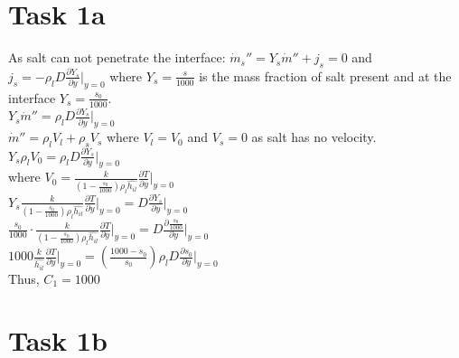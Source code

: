\documentclass[letterpaper, 10pt]{article}
\begin{document}
	
	\section*{Task 1a} %
	\label{sec:Task 1a}
	As salt can not penetrate the interface: $\dot{m}_s'' = Y_s \dot{m}'' + j_s = 0$ and $j_s = -\rho_l D \frac{\partial Y_s}{\partial y}\big|_{y=0}$ where $Y_s = \frac{s}{1000}$ is the mass fraction of salt present and at the interface $Y_s = \frac{s_0}{1000}$.\\
		
	\noindent $Y_s \dot{m}'' = \rho_l D \frac{\partial Y_s}{\partial y}\big|_{y=0}$\\
	\noindent $\dot{m}'' = \rho_l V_l + \rho_s V_s$ where $V_l = V_0$ and $V_s = 0$ as salt has no velocity.\\
	
	\noindent $Y_s \rho_l V_0 = \rho_l D \frac{\partial Y_s}{\partial y}\big|_{y=0}$\\
	
	\noindent where $V_0 = \frac{k}{\left(1-\frac{s_0}{1000}\right)\rho_l \hat{h_{il}}} \frac{\partial T}{\partial y}\big|_{y=0}$\\
	
	\noindent $Y_s  \frac{k}{\left(1-\frac{s_0}{1000}\right)\rho_l \hat{h_{il}}} \frac{\partial T}{\partial y}\big|_{y=0} = D  \frac{\partial Y_s}{\partial y}\big|_{y=0}$\\
	
	\noindent $\frac{s_0}{1000} \cdot \frac{k}{\left(1-\frac{s_0}{1000}\right)\rho_l \hat{h_{il}}} \frac{\partial T}{\partial y}\big|_{y=0} = D  \frac{\partial \frac{s_0}{1000} }{\partial y}\big|_{y=0}$\\
	
	\noindent $1000 \frac{k}{\hat{h_{il}}} \frac{\partial T}{\partial y}\big|_{y=0} = \left(\frac{1000-s_0}{s_0}\right) \rho_l D \frac{\partial s_0}{\partial y}\big|_{y=0} $\\
	
	Thus, $C_1 = 1000 $\\
	
	
	\section*{Task 1b} %
	\label{sec:Task 1b}
\end{document}
